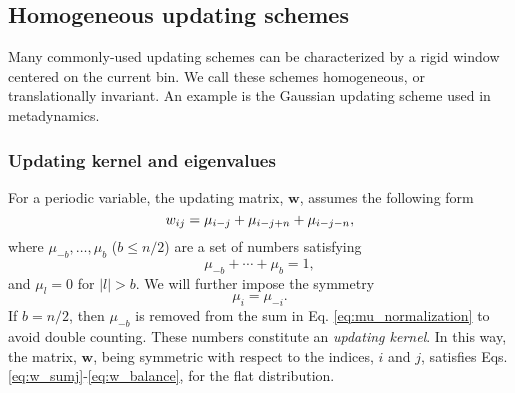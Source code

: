 \documentclass[reprint, superscriptaddress, floatfix]{revtex4-1}
\begin{document}
\subsection{\label{sec:band-matrix}
Homogeneous updating schemes}



Many commonly-used updating schemes
can be characterized by a rigid window
centered on the current bin.
%
We call these schemes homogeneous,
or translationally invariant.
%
An example is the Gaussian updating scheme
used in metadynamics.



\subsubsection{\label{sec:bandkernel}
Updating kernel and eigenvalues}






For a periodic variable\cite{dama2014},
the updating matrix, $\mathbf w$,
assumes the following form
%
\begin{equation}
  w_{ij}
  =
  \mu_{i-j}
  +
  \mu_{i-j+n}
  +
  \mu_{i-j-n}
  ,
\notag
\end{equation}
%
where
$\mu_{-b}, \dots, \mu_b$ ($b \le n/2$)
are a set of numbers satisfying
%
\begin{equation}
  \mu_{-b} + \cdots + \mu_b = 1
  ,
\label{eq:mu_normalization}
\end{equation}
%
and $\mu_l = 0$ for $|l| > b$.
%
We will further impose the symmetry
%
\begin{equation}
  \mu_i = \mu_{-i}
  .
\label{eq:mu_symm}
\end{equation}
%
If $b = n/2$, then $\mu_{-b}$ is removed
from the sum in Eq. \eqref{eq:mu_normalization}
to avoid double counting.
%
These numbers constitute an \emph{updating kernel}\cite{bussi2006}.
%
In this way, the matrix, $\mathbf w$,
being symmetric with respect to the indices, $i$ and $j$,
satisfies Eqs. \eqref{eq:w_sumj}-\eqref{eq:w_balance},
for the flat distribution.
\end{document}
